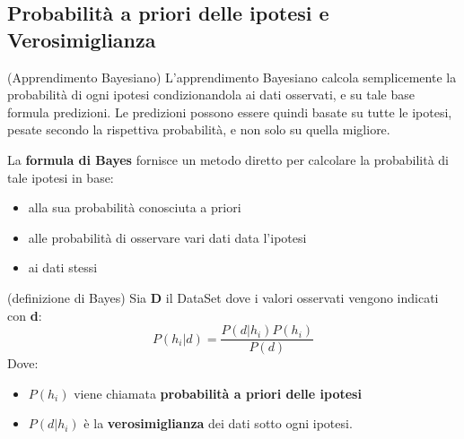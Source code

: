\subsection{Probabilità a priori delle ipotesi e Verosimiglianza}
\begin{definizione}(Apprendimento Bayesiano)
L'apprendimento Bayesiano calcola semplicemente la probabilità di ogni ipotesi condizionandola ai dati osservati,  e su tale base formula predizioni. Le predizioni possono essere quindi basate su tutte le ipotesi, pesate secondo la rispettiva probabilità, e non solo su quella migliore.
\end{definizione}
La \textbf{formula di Bayes} fornisce un metodo diretto per calcolare la probabilità di tale ipotesi in base:
\begin{itemize}
  \item alla sua probabilità conosciuta a priori
  \item alle probabilità di osservare vari dati data l'ipotesi
  \item ai dati stessi
\end{itemize}
\begin{definizione}(definizione di Bayes)
  Sia \textbf{D} il DataSet dove i valori osservati vengono indicati con \textbf{d}:
  \[P(h_i|d)=\frac{P(d|h_i)P(h_i)}{P(d)}\]
  Dove:
  \begin{itemize}
        \item $P(h_i)$ viene chiamata \textbf{probabilità a priori delle ipotesi}
        \item $P(d|h_i)$ è la \textbf{verosimiglianza} dei dati sotto ogni ipotesi.
    \end{itemize}
\end{definizione}
